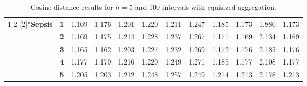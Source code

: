 \begin{table}[htbp]
{\begin{tabular}{|cl|rrrrrrrrrr|}
\cmidrule{1-2}    \multirow{5}[2]{*}{\textbf{Sepsis}} & \textbf{1} & \cellcolor[rgb]{ .851,  .851,  .851}1.169 & \cellcolor[rgb]{ .851,  .851,  .851}1.176 & \cellcolor[rgb]{ .847,  .847,  .847}1.201 & \cellcolor[rgb]{ .843,  .843,  .843}1.220 & \cellcolor[rgb]{ .843,  .843,  .843}1.211 & \cellcolor[rgb]{ .835,  .835,  .835}1.247 & \cellcolor[rgb]{ .847,  .847,  .847}1.185 & \cellcolor[rgb]{ .851,  .851,  .851}1.173 & \cellcolor[rgb]{ .714,  .714,  .714}1.880 & \cellcolor[rgb]{ .851,  .851,  .851}1.173 \\
          & \textbf{2} & \cellcolor[rgb]{ .851,  .851,  .851}1.169 & \cellcolor[rgb]{ .851,  .851,  .851}1.175 & \cellcolor[rgb]{ .843,  .843,  .843}1.214 & \cellcolor[rgb]{ .839,  .839,  .839}1.228 & \cellcolor[rgb]{ .839,  .839,  .839}1.237 & \cellcolor[rgb]{ .831,  .831,  .831}1.267 & \cellcolor[rgb]{ .851,  .851,  .851}1.171 & \cellcolor[rgb]{ .851,  .851,  .851}1.169 & \cellcolor[rgb]{ .663,  .663,  .663}2.134 & \cellcolor[rgb]{ .851,  .851,  .851}1.169 \\
          & \textbf{3} & \cellcolor[rgb]{ .851,  .851,  .851}1.165 & \cellcolor[rgb]{ .851,  .851,  .851}1.162 & \cellcolor[rgb]{ .843,  .843,  .843}1.203 & \cellcolor[rgb]{ .839,  .839,  .839}1.227 & \cellcolor[rgb]{ .839,  .839,  .839}1.232 & \cellcolor[rgb]{ .831,  .831,  .831}1.269 & \cellcolor[rgb]{ .851,  .851,  .851}1.172 & \cellcolor[rgb]{ .851,  .851,  .851}1.176 & \cellcolor[rgb]{ .651,  .651,  .651}2.185 & \cellcolor[rgb]{ .851,  .851,  .851}1.176 \\
          & \textbf{4} & \cellcolor[rgb]{ .851,  .851,  .851}1.177 & \cellcolor[rgb]{ .851,  .851,  .851}1.179 & \cellcolor[rgb]{ .843,  .843,  .843}1.216 & \cellcolor[rgb]{ .843,  .843,  .843}1.220 & \cellcolor[rgb]{ .835,  .835,  .835}1.249 & \cellcolor[rgb]{ .831,  .831,  .831}1.271 & \cellcolor[rgb]{ .847,  .847,  .847}1.185 & \cellcolor[rgb]{ .851,  .851,  .851}1.177 & \cellcolor[rgb]{ .667,  .667,  .667}2.108 & \cellcolor[rgb]{ .851,  .851,  .851}1.177 \\
          & \textbf{5} & \cellcolor[rgb]{ .843,  .843,  .843}1.205 & \cellcolor[rgb]{ .843,  .843,  .843}1.203 & \cellcolor[rgb]{ .843,  .843,  .843}1.212 & \cellcolor[rgb]{ .835,  .835,  .835}1.248 & \cellcolor[rgb]{ .835,  .835,  .835}1.257 & \cellcolor[rgb]{ .835,  .835,  .835}1.249 & \cellcolor[rgb]{ .843,  .843,  .843}1.214 & \cellcolor[rgb]{ .843,  .843,  .843}1.213 & \cellcolor[rgb]{ .655,  .655,  .655}2.178 & \cellcolor[rgb]{ .843,  .843,  .843}1.213 \\
    \bottomrule
    \end{tabular}
    }
  \caption{Cosine distance results for $h=5$ and 100 intervals with equisized aggregation.}
  \label{tab:equisize_100}%
\end{table}%
